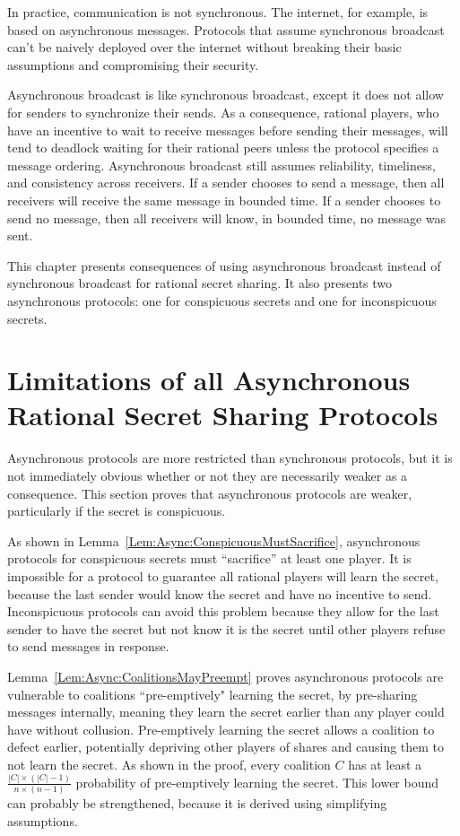 \documentclass[12pt]{dalcsthesis}
\begin{document}
In practice, communication is not synchronous. The internet, for example, is based on asynchronous messages. Protocols that assume synchronous broadcast can't be naively deployed over the internet without breaking their basic assumptions and compromising their security.

Asynchronous broadcast is like synchronous broadcast, except it does not allow for senders to synchronize their sends. As a consequence, rational players, who have an incentive to wait to receive messages before sending their messages, will tend to deadlock waiting for their rational peers unless the protocol specifies a message ordering. Asynchronous broadcast still assumes reliability, timeliness, and consistency across receivers. If a sender chooses to send a message, then all receivers will receive the same message in bounded time. If a sender chooses to send no message, then all receivers will know, in bounded time, no message was sent.

This chapter presents consequences of using asynchronous broadcast instead of synchronous broadcast for rational secret sharing. It also presents two asynchronous protocols: one for conspicuous secrets and one for inconspicuous secrets.

\section{Limitations of all Asynchronous Rational Secret Sharing Protocols}
\label{Sec:AsympWeak}

Asynchronous protocols are more restricted than synchronous protocols, but it is not immediately obvious whether or not they are necessarily weaker as a consequence. This section proves that asynchronous protocols are weaker, particularly if the secret is conspicuous.

As shown in Lemma~\ref{Lem:Async:ConspicuousMustSacrifice}, asynchronous protocols for conspicuous secrets must ``sacrifice'' at least one player. It is impossible for a protocol to guarantee all rational players will learn the secret, because the last sender would know the secret and have no incentive to send. Inconspicuous protocols can avoid this problem because they allow for the last sender to have the secret but not know it is the secret until other players refuse to send messages in response.

Lemma~\ref{Lem:Async:CoalitionsMayPreempt} proves asynchronous protocols are vulnerable to coalitions ``pre-emptively" learning the secret, by pre-sharing messages internally, meaning they learn the secret earlier than any player could have without collusion. Pre-emptively learning the secret allows a coalition to defect earlier, potentially depriving other players of shares and causing them to not learn the secret. As shown in the proof, every coalition $C$ has at least a $\frac{|C| \times (|C| - 1)}{n \times (n-1)}$ probability of pre-emptively learning the secret. This lower bound can probably be strengthened, because it is derived using simplifying assumptions.
\end{document}
